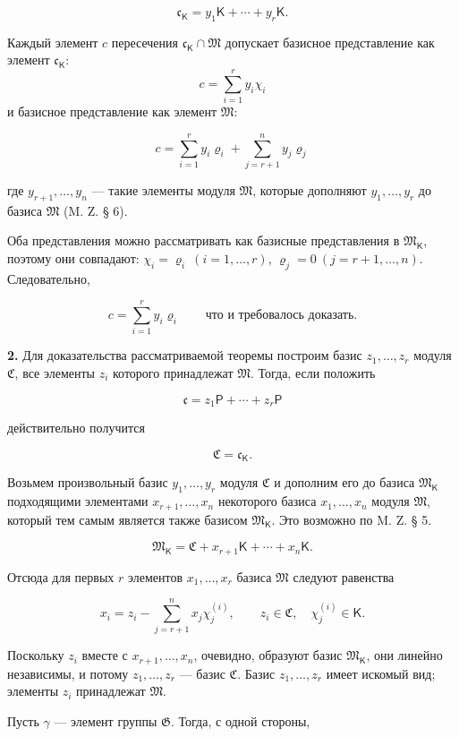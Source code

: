 \documentclass[11pt]{article}
\begin{document}
\[
\mathfrak c_{\mathsf K}=y_1\mathsf K+\cdots+y_r\mathsf K.
\]

Каждый элемент \(c\) пересечения \(\mathfrak c_{\mathsf K}\cap\mathfrak M\) допускает базисное представление как элемент \(\mathfrak c_{\mathsf K}\):
\[
c=\sum_{i=1}^{r}y_i\chi_i
\]
и базисное представление как элемент \(\mathfrak M\):

\[
c=\sum_{i=1}^{r}y_i\varrho_i+\sum_{j=r+1}^{n}y_j\varrho_j
\]

где \(y_{r+1},\ldots,y_n\) --- такие элементы модуля \(\mathfrak M\), которые дополняют \(y_1,\ldots,y_r\) до базиса \(\mathfrak M\) (M. Z. § 6).

Оба представления можно рассматривать как базисные представления в \(\mathfrak M_{\mathsf K}\), поэтому они совпадают: \(\chi_i=\varrho_i\ (i=1,\ldots,r)\), \(\varrho_j=0\ (j=r+1,\ldots,n)\). Следовательно,

\[
c=\sum_{i=1}^{r}y_i\varrho_i
\qquad\text{что и требовалось доказать.}
\]

\textbf{2.} Для доказательства рассматриваемой теоремы построим базис \(z_1,\ldots,z_r\) модуля \(\mathfrak C\), все элементы \(z_i\) которого принадлежат \(\mathfrak M\). Тогда, если положить

\[
\mathfrak c=z_1\mathsf P+\cdots+z_r\mathsf P
\]

действительно получится

\[
\mathfrak C=\mathfrak c_{\mathsf K}.
\]

Возьмем произвольный базис \(y_1,\ldots,y_r\) модуля \(\mathfrak C\) и дополним его до базиса \(\mathfrak M_{\mathsf K}\) подходящими элементами \(x_{r+1},\ldots,x_n\) некоторого базиса \(x_1,\ldots,x_n\) модуля \(\mathfrak M\), который тем самым является также базисом \(\mathfrak M_{\mathsf K}\). Это возможно по M. Z. § 5.

\[
\mathfrak M_{\mathsf K}=\mathfrak C+x_{r+1}\mathsf K+\cdots+x_n\mathsf K.
\]

Отсюда для первых \(r\) элементов \(x_1,\ldots,x_r\) базиса \(\mathfrak M\) следуют равенства

\[
x_i=z_i-\sum_{j=r+1}^{n}x_j\chi_j^{(i)},\qquad
z_i\in\mathfrak C,\quad \chi_j^{(i)}\in\mathsf K.
\]

Поскольку \(z_i\) вместе с \(x_{r+1},\ldots,x_n\), очевидно, образуют базис \(\mathfrak M_{\mathsf K}\), они линейно независимы, и потому \(z_1,\ldots,z_r\) --- базис \(\mathfrak C\). Базис \(z_1,\ldots,z_r\) имеет искомый вид; элементы \(z_i\) принадлежат \(\mathfrak M\).

Пусть \(\gamma\) --- элемент группы \(\mathfrak G\). Тогда, с одной стороны,
\end{document}
